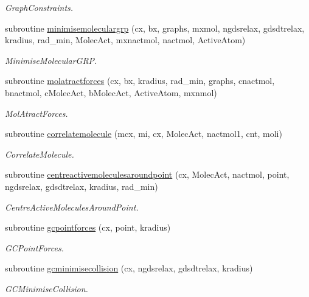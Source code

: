 \begin{DoxyCompactItemize}
\begin{DoxyCompactList}\small\item\em Graph\+Constraints. \end{DoxyCompactList}\item 
subroutine \mbox{\hyperlink{namespacechemstr_a2134606948b8e1c9fcf97b48bfe34ec2}{minimisemoleculargrp}} (cx, bx, graphs, mxmol, ngdsrelax, gdsdtrelax, kradius, rad\+\_\+min, Molec\+Act, mxnactmol, nactmol, Active\+Atom)
\begin{DoxyCompactList}\small\item\em Minimise\+Molecular\+G\+RP. \end{DoxyCompactList}\item 
subroutine \mbox{\hyperlink{namespacechemstr_a3acc7c59e5b1773d5624966eab42579d}{molatractforces}} (cx, bx, kradius, rad\+\_\+min, graphs, cnactmol, bnactmol, c\+Molec\+Act, b\+Molec\+Act, Active\+Atom, mxnmol)
\begin{DoxyCompactList}\small\item\em Mol\+Atract\+Forces. \end{DoxyCompactList}\item 
subroutine \mbox{\hyperlink{namespacechemstr_a440319c79068791288579e71bf50a5a2}{correlatemolecule}} (mcx, mi, cx, Molec\+Act, nactmol1, cnt, moli)
\begin{DoxyCompactList}\small\item\em Correlate\+Molecule. \end{DoxyCompactList}\item 
subroutine \mbox{\hyperlink{namespacechemstr_a2deb37a2e94b8dc83c28990d66806a50}{centreactivemoleculesaroundpoint}} (cx, Molec\+Act, nactmol, point, ngdsrelax, gdsdtrelax, kradius, rad\+\_\+min)
\begin{DoxyCompactList}\small\item\em Centre\+Active\+Molecules\+Around\+Point. \end{DoxyCompactList}\item 
subroutine \mbox{\hyperlink{namespacechemstr_aacd6e15b4920ee661af0964754a972ca}{gcpointforces}} (cx, point, kradius)
\begin{DoxyCompactList}\small\item\em G\+C\+Point\+Forces. \end{DoxyCompactList}\item 
subroutine \mbox{\hyperlink{namespacechemstr_a32a650687453b543778404b5fb1e6e24}{gcminimisecollision}} (cx, ngdsrelax, gdsdtrelax, kradius)
\begin{DoxyCompactList}\small\item\em G\+C\+Minimise\+Collision. \end{DoxyCompactList}\item 

\end{DoxyCompactItemize}
